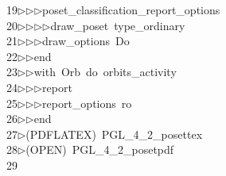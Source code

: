 \begin{tabbing}
19\>$\triangleright$\>$\triangleright$\>$\triangleright$\>poset\_classification\_report\_options\ \\[0pt]
20\>$\triangleright$\>$\triangleright$\>$\triangleright$\>$\triangleright$\>draw\_poset\ type\_ordinary\ \\[0pt]
21\>$\triangleright$\>$\triangleright$\>$\triangleright$\>draw\_options\ Do\ \\[0pt]
22\>$\triangleright$\>$\triangleright$\>end\ \\[0pt]
23\>$\triangleright$\>$\triangleright$\>with\ Orb\ do\ orbits\_activity\ \\[0pt]
24\>$\triangleright$\>$\triangleright$\>$\triangleright$\>report\ \ \\[0pt]
25\>$\triangleright$\>$\triangleright$\>$\triangleright$\>report\_options\ ro\ \\[0pt]
26\>$\triangleright$\>$\triangleright$\>end\ \\[0pt]
27\>$\triangleright$\>(PDFLATEX)\ PGL\_4\_2\_posettex\\[0pt]
28\>$\triangleright$\>(OPEN)\ PGL\_4\_2\_posetpdf\\[0pt]
29\>\end{tabbing}
